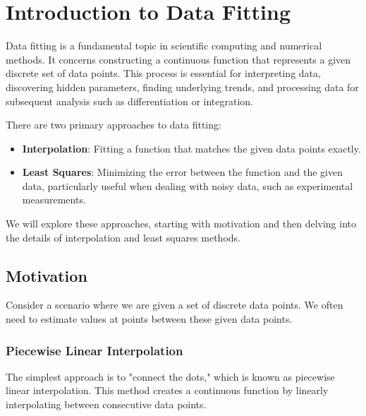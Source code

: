 \documentclass{article}
\begin{document}
\sloppy

\section{Introduction to Data Fitting}

Data fitting is a fundamental topic in scientific computing and numerical methods. It concerns constructing a continuous function that represents a given discrete set of data points. This process is essential for interpreting data, discovering hidden parameters, finding underlying trends, and processing data for subsequent analysis such as differentiation or integration.

There are two primary approaches to data fitting:

\begin{itemize}
    \item \textbf{Interpolation}:  Fitting a function that matches the given data points exactly.
    \item \textbf{Least Squares}: Minimizing the error between the function and the given data, particularly useful when dealing with noisy data, such as experimental measurements.
\end{itemize}

We will explore these approaches, starting with motivation and then delving into the details of interpolation and least squares methods.

\subsection{Motivation}

Consider a scenario where we are given a set of discrete data points. We often need to estimate values at points between these given data points.

\subsubsection{Piecewise Linear Interpolation}

The simplest approach is to "connect the dots," which is known as piecewise linear interpolation. This method creates a continuous function by linearly interpolating between consecutive data points.
\end{document}
